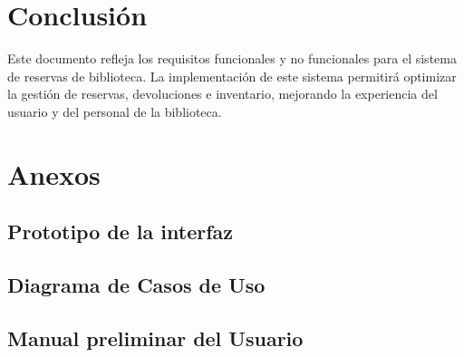 \documentclass{scrreprt}
\begin{document}
\chapter{Conclusión}
Este documento refleja los requisitos funcionales y no funcionales para el sistema de reservas de biblioteca. La implementación de este sistema permitirá optimizar la gestión de reservas, devoluciones e inventario, mejorando la experiencia del usuario y del personal de la biblioteca.

\chapter{Anexos}
\section{Prototipo de la interfaz} 

\section{Diagrama de Casos de Uso} 

\section{Manual preliminar del Usuario} 
\end{document}
